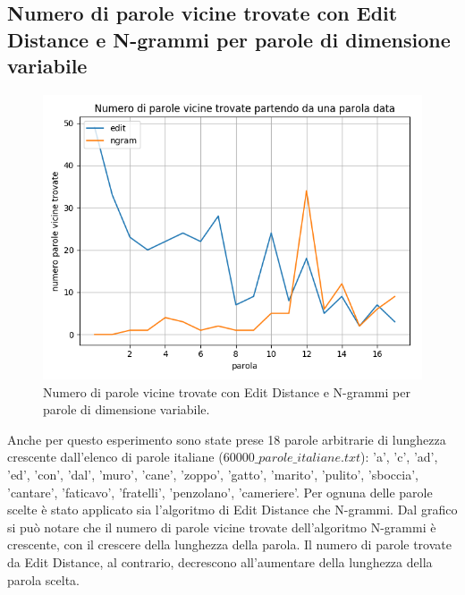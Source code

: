 \documentclass[a4paper,12pt]{article}
\begin{document}
\subsection{Numero di parole vicine trovate con Edit Distance e N-grammi per parole di dimensione variabile}
\begin{figure}[h]
    \centering
    \captionsetup{justification=centering,margin=1.05cm}
    \includegraphics[width=1.0\textwidth]{Figure_2}
    \caption{Numero di parole vicine trovate con Edit Distance e N-grammi per parole di dimensione variabile.}
    \label{fig:test2_2}
\end{figure}
Anche per questo esperimento sono state prese 18 parole arbitrarie di lunghezza crescente dall'elenco di parole italiane ($60000\_parole\_italiane.txt$): 'a', 'c', 'ad', 'ed', 'con', 'dal', 'muro', 'cane', 'zoppo', 'gatto', 'marito', 'pulito', 'sboccia', 'cantare', 'faticavo', 'fratelli', 'penzolano', 'cameriere'.
\newline
\newline
Per ognuna delle parole scelte è stato applicato sia l'algoritmo di Edit Distance che N-grammi.
\newline
\newline
Dal grafico si può notare che il numero di parole vicine trovate dell'algoritmo N-grammi è crescente, con il crescere della lunghezza della parola.
\newline
\newline
Il numero di parole trovate da Edit Distance, al contrario, decrescono all'aumentare della lunghezza della parola scelta.

\clearpage
\end{document}
